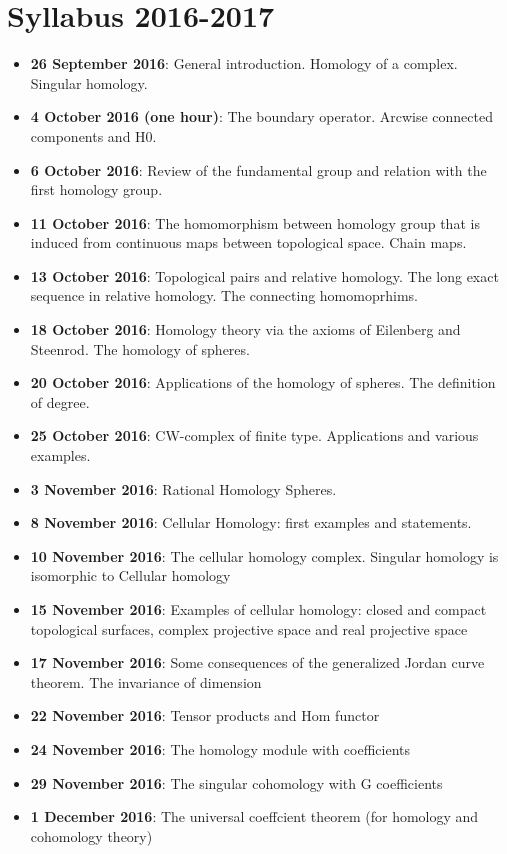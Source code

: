 \documentclass[10pt, twoside=false, x11names]{scrbook}
\begin{document}
\chapter*{Syllabus 2016-2017}
\begin{itemize}
\item \textbf{26 September 2016}: General introduction. Homology of a complex. Singular homology.
\item \textbf{4 October 2016 (one hour)}: The boundary operator. Arcwise connected components and H0.
\item \textbf{6 October 2016}: Review of the fundamental group and relation with the first homology group.
\item \textbf{11 October 2016}: The homomorphism between homology group that is induced from continuous maps between topological space. Chain maps.
\item \textbf{13 October 2016}: Topological pairs and relative homology. The long exact sequence in relative homology. The connecting homomoprhims.
\item \textbf{18 October 2016}: Homology theory via the axioms of Eilenberg and Steenrod. The homology of spheres.
\item \textbf{20 October 2016}: Applications of the homology of spheres. The definition of degree.
\item \textbf{25 October 2016}: CW-complex of finite type. Applications and various examples.
\item \textbf{3 November 2016}: Rational Homology Spheres.
\item \textbf{8 November 2016}: Cellular Homology: first examples and statements.
\item \textbf{10 November 2016}: The cellular homology complex. Singular homology is isomorphic to Cellular homology
\item \textbf{15 November 2016}: Examples of cellular homology: closed and compact topological surfaces, complex projective space and real projective space
\item \textbf{17 November 2016}: Some consequences of the generalized Jordan curve theorem. The invariance of dimension
\item \textbf{22 November 2016}: Tensor products and Hom functor
\item \textbf{24 November 2016}: The homology module with coefficients
\item \textbf{29 November 2016}: The singular cohomology with G coefficients
\item \textbf{1 December 2016}: The universal coeffcient theorem (for homology and cohomology theory)

\end{itemize}
\end{document}
